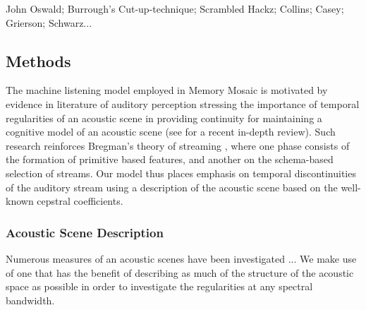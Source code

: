 \documentclass[a4paper,10pt,final]{ThesisStyle}
\begin{document}
John Oswald; Burrough's Cut-up-technique; Scrambled Hackz; Collins; Casey; Grierson; Schwarz...






\subsection{Methods}
\label{sec:machine-listening-model}

The machine listening model employed in Memory Mosaic is motivated by evidence in  literature of auditory perception stressing the importance of temporal regularities of an acoustic scene in providing continuity for maintaining a cognitive model of an acoustic scene (see \cite{Winkler2009a} for a recent in-depth review).  Such research reinforces Bregman's theory of streaming \cite{Bregman1990}, where one phase consists of the formation of primitive based features, and another on the schema-based selection of streams.  Our model thus places emphasis on temporal discontinuities of the auditory stream using a description of the acoustic scene based on the well-known cepstral coefficients.  %

\subsubsection{Acoustic Scene Description}
\label{subsec:acoustic-scene-description}

Numerous measures of an acoustic scenes have been investigated ...  We make use of one that has the benefit of describing as much of the structure of the acoustic space as possible in order to investigate the regularities at any spectral bandwidth.  
\end{document}
